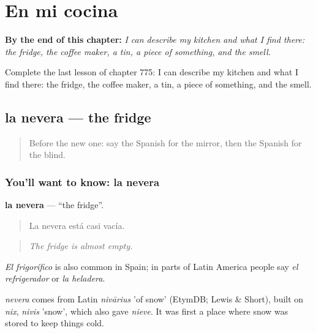 
\chapter{En mi cocina}
\label{ch:es-en-mi-cocina}

\begin{chapteropening}
\textbf{By the end of this chapter:} \emph{I can describe my kitchen and what I find there: the fridge, the coffee maker, a tin, a piece of something, and the smell.}

Complete the last lesson of chapter 775: I can describe my kitchen and what I find there: the fridge, the coffee maker, a tin, a piece of something, and the smell.
\end{chapteropening}

\section[la nevera]{la nevera — the fridge}

\label{lesson:ES-C775-nevera}



\begin{quote}
Before the new one: say the Spanish for the mirror, then the Spanish for the blind.
\end{quote}

\subsection*{You'll want to know: la nevera}
\textbf{la nevera} — \textquotedblleft{}the fridge\textquotedblright{}.

\begin{quote}
La nevera está casi vacía.
\end{quote}

\begin{quote}
\emph{The fridge is almost empty.}
\end{quote}

\emph{El frigorífico} is also common in Spain; in parts of Latin America people say \emph{el refrigerador} or \emph{la heladera}.

\begin{cousinweb}
\emph{nevera} comes from Latin \emph{nivārius} 'of snow' (EtymDB; Lewis \& Short), built on \emph{nix}, \emph{nivis} 'snow', which also gave \emph{nieve}. It was first a place where snow was stored to keep things cold.
\end{cousinweb}

